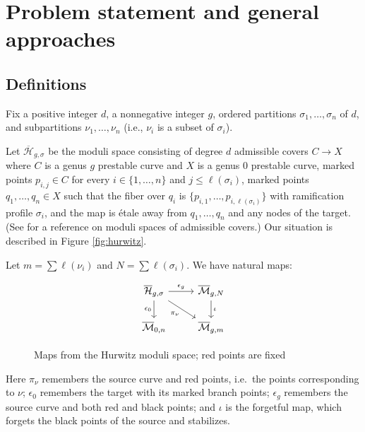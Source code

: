\documentclass[thesis]{thesis-umich}           %
\newcommand{\Hb}{\overline{\mathcal H}}
\theoremstyle{definition}
\begin{document}
\chapter{Problem statement and general approaches}

\section{Definitions}
Fix a positive integer $d$, a nonnegative integer $g$, ordered partitions $\sigma_1,\dots,\sigma_n$ of $d$, and subpartitions $\nu_1,\dots,\nu_n$ (i.e., $\nu_i$ is a subset of $\sigma_i$).

Let $\Hb_{g,\sigma}$ be the moduli space consisting of degree $d$ admissible covers $C\to X$ where $C$ is a genus $g$ prestable curve and $X$ is a genus $0$ prestable curve, marked points $p_{i,j}\in C$ for every $i\in\{1,\dots,n\}$ and
$j\leq \ell(\sigma_i)$, 
marked points $q_1,\dots,q_n\in X$ such that
the fiber over $q_i$ is $\{p_{i,1},\dots,p_{i,\ell(\sigma_i)}\}$ with
ramification profile $\sigma_i$, and the map is \'etale away from $q_1,\dots,q_n$ and any nodes of the target. (See \cite{Admissible} for a reference on moduli spaces of admissible covers.) Our situation is described in Figure \ref{fig:hurwitz}.



Let $m=\sum\ell(\nu_i)$ and $N=\sum\ell(\sigma_i)$.
We have natural maps:
\begin{figure}[h]
  \caption{Maps from the Hurwitz moduli space; red points are fixed}
  \centering
  \[\begin{tikzcd}
	{\overline{\mathcal H}_{g,\sigma}} & {\overline{\mathcal M}_{g,N}} \\
	{\overline{\mathcal M}_{0,n}} & {\overline{\mathcal M}_{g,m}}
	\arrow["{\epsilon_g}", from=1-1, to=1-2]
	\arrow["{\epsilon_0}"', from=1-1, to=2-1]
	\arrow["{\pi_{\nu}}"', from=1-1, to=2-2]
	\arrow["\iota", from=1-2, to=2-2]
\end{tikzcd}\]
\label{fig:maps}
\end{figure}



Here $\pi_{\nu}$ remembers the source curve and red points, i.e.\ the points corresponding to $\nu$; $\epsilon_0$ remembers the target with its marked
branch points; $\epsilon_g$ remembers the source curve and both red
and black points; and $\iota$ is the forgetful map, which forgets
the black points of the source and stabilizes.
\end{document}
